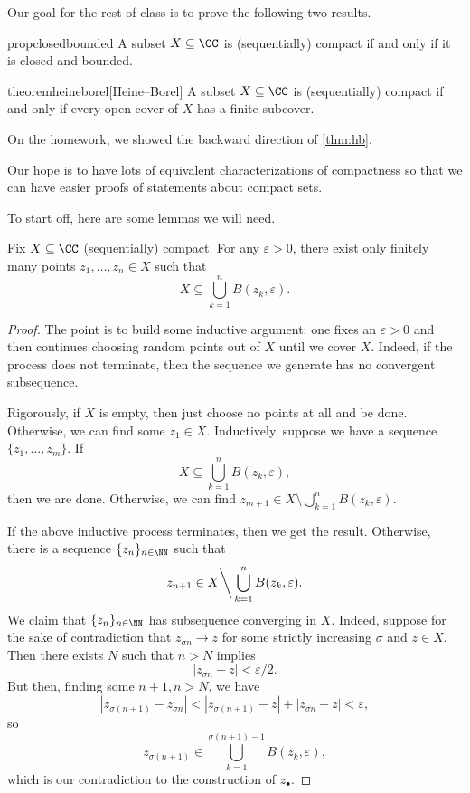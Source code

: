 Our goal for the rest of class is to prove the following two results.
\begin{restatable}{prop}{closedbounded}
	A subset $X\subseteq\CC$ is (sequentially) compact if and only if it is closed and bounded.
\end{restatable}
\begin{restatable}{theorem}{heineborel}[Heine--Borel] \label{thm:hb}
	A subset $X\subseteq\CC$ is (sequentially) compact if and only if every open cover of $X$ has a finite subcover.
\end{restatable}
On the homework, we showed the backward direction of \autoref{thm:hb}.
\begin{remark}
	Our hope is to have lots of equivalent characterizations of compactness so that we can have easier proofs of statements about compact sets.
\end{remark}
To start off, here are some lemmas we will need.
\begin{lemma}
	Fix $X\subseteq\CC$ (sequentially) compact. For any $\varepsilon>0$, there exist only finitely many points $z_1,\ldots,z_n\in X$ such that
	\[X\subseteq\bigcup_{k=1}^nB(z_k,\varepsilon).\]
\end{lemma}
\begin{proof}
	The point is to build some inductive argument: one fixes an $\varepsilon>0$ and then continues choosing random points out of $X$ until we cover $X$. Indeed, if the process does not terminate, then the sequence we generate has no convergent subsequence.

	Rigorously, if $X$ is empty, then just choose no points at all and be done. Otherwise, we can find some $z_1\in X$. Inductively, suppose we have a sequence $\{z_1,\ldots,z_m\}$. If
	\[X\subseteq\bigcup_{k=1}^nB(z_k,\varepsilon),\]
	then we are done. Otherwise, we can find $z_{m+1}\in X\setminus\bigcup_{k=1}^nB(z_k,\varepsilon)$.

	If the above inductive process terminates, then we get the result. Otherwise, there is a sequence $\{z_n\}_{n\in\NN}$ such that
	\[z_{n+1}\in X{\mathbin\bigg\backslash}\bigcup_{k=1}^nB(z_k,\varepsilon).\]
	We claim that $\{z_n\}_{n\in\NN}$ has subsequence converging in $X$. Indeed, suppose for the sake of contradiction that $z_{\sigma n}\to z$ for some strictly increasing $\sigma$ and $z\in X$. Then there exists $N$ such that $n>N$ implies
	\[|z_{\sigma n}-z|<\varepsilon/2.\]
	But then, finding some $n+1,n>N$, we have
	\[|z_{\sigma(n+1)}-z_{\sigma n}|<|z_{\sigma(n+1)}-z|+|z_{\sigma n}-z|<\varepsilon,\]
	so
	\[z_{\sigma(n+1)}\in\bigcup_{k=1}^{\sigma(n+1)-1}B(z_k,\varepsilon),\]
	which is our contradiction to the construction of $z_\bullet$.
\end{proof}
